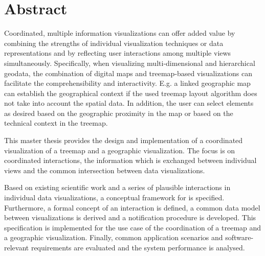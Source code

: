 \chapter*{Abstract}

Coordinated, multiple information visualizations can offer added value by combining the strengths of individual visualization techniques or data representations and by reflecting user interactions among multiple views simultaneously.
Specifically, when visualizing multi-dimensional and hierarchical geodata, the combination of digital maps and treemap-based visualizations can facilitate the comprehensibility and interactivity.
E.g. a linked geographic map can establish the geographical context if the used treemap layout algorithm does not take into account the spatial data.
In addition, the user can select elements as desired based on the geographic proximity in the map or based on the technical context in the treemap.

This master thesis provides the design and implementation of a coordinated visualization of a treemap and a geographic visualization.
The focus is on coordinated interactions, the information which is exchanged between individual views and the common intersection between data visualizations.

Based on existing scientific work and a series of plausible interactions in individual data visualizations, a conceptual framework for \cmvs{} is specified.
Furthermore, a formal concept of an interaction is defined, a common data model between visualizations is derived and a notification procedure is developed.
This specification is implemented for the use case of the coordination of a treemap and a geographic visualization.
Finally, common application scenarios and software-relevant requirements are evaluated and the system performance is analysed.

